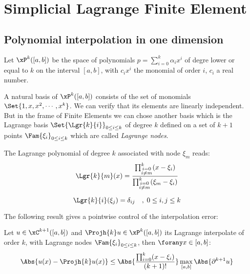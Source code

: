 
\chapter{Simplicial Lagrange Finite Element}\label{sec:lagrange}

\section{Polynomial interpolation in one dimension}

Let $\xP^k([a,b])$ be the space of polynomials $p = \sum_{i=0}^k \alpha_i x^i$ of degre lower or equal to $k$ on the interval $[a,b]$, with $c_i x^i$ the monomial of order $i$, $c_i$ a real number.

\medskip
A natural basis of $\xP^k([a,b])$ consists of the set of monomials $\Set{1,x,x^2,\cdots,x^k}$.
We can verify that its elements are linearly independent.
But in the frame of Finite Elements we can chose another basis which is the Lagrange basis $\Set{\Lgr{k}{i}}_{0 \leq i \leq k}$ of degree $k$ defined on a set of $k+1$ points $\Fam{\xi_i}_{0 \leq i \leq k}$ which are called \textit{Lagrange nodes}.

\begin{dfntn}
\label{def:lagrange_poly}
The Lagrange polynomial of degree $k$ associated with node $\xi_m$ reads:
\begin{equation*}
\Lgr{k}{m}(x) = \dfrac{\prod_{\substack{i=0\\i\not=m}}^k (x - \xi_i)}{\prod_{\substack{i=0\\i\not=m}}^k (\xi_m - \xi_i)}
\end{equation*}
\end{dfntn}

\begin{prpstn}
\begin{equation*}
\Lgr{k}{i}(\xi_j) = \delta_{ij}\quad,\;0 \leq i,j \leq k
\end{equation*}
\end{prpstn}

\bigskip
The following result gives a pointwise control of the interpolation error:
\begin{thrm}
\label{th:polyinterpol}
Let $u\in\xC^{k+1}([a,b])$ and $\Projh{k} u \in \xP^k([a,b])$ its Lagrange interpolate of order $k$, with Lagrange nodes $\Fam{\xi_i}_{0\leq i \leq k}$, then $\forany x \in [a,b]$:
\begin{equation*}
\Abs{u(x) - \Projh{k} u(x)} \leq \Abs{\dfrac{\prod_{i=0}^k (x - \xi_i)}{(k+1)!}}\max_{[a,b]}\Abs{\partial^{k+1} u}
\end{equation*}
\end{thrm}

